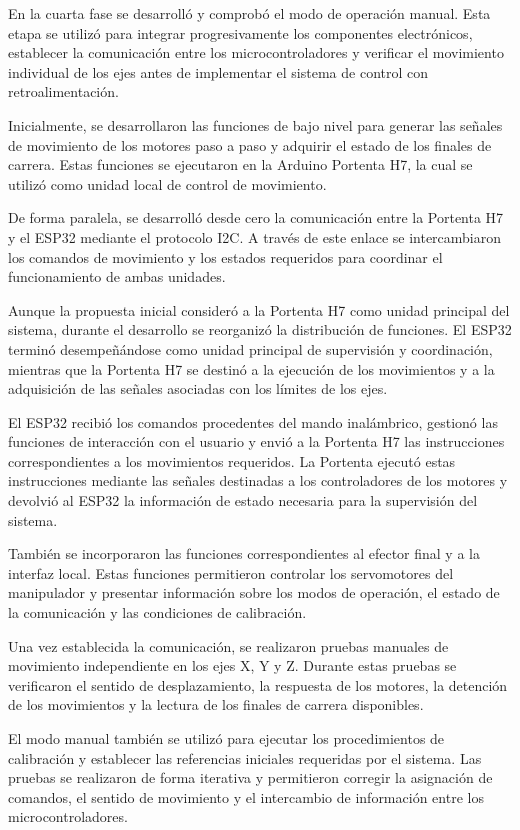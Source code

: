 En la cuarta fase se desarrolló y comprobó el modo de operación manual. Esta etapa se utilizó para integrar progresivamente los componentes electrónicos, establecer la comunicación entre los microcontroladores y verificar el movimiento individual de los ejes antes de implementar el sistema de control con retroalimentación.

Inicialmente, se desarrollaron las funciones de bajo nivel para generar las señales de movimiento de los motores paso a paso y adquirir el estado de los finales de carrera. Estas funciones se ejecutaron en la Arduino Portenta H7, la cual se utilizó como unidad local de control de movimiento.

De forma paralela, se desarrolló desde cero la comunicación entre la Portenta H7 y el ESP32 mediante el protocolo I2C. A través de este enlace se intercambiaron los comandos de movimiento y los estados requeridos para coordinar el funcionamiento de ambas unidades.

Aunque la propuesta inicial consideró a la Portenta H7 como unidad principal del sistema, durante el desarrollo se reorganizó la distribución de funciones. El ESP32 terminó desempeñándose como unidad principal de supervisión y coordinación, mientras que la Portenta H7 se destinó a la ejecución de los movimientos y a la adquisición de las señales asociadas con los límites de los ejes.

El ESP32 recibió los comandos procedentes del mando inalámbrico, gestionó las funciones de interacción con el usuario y envió a la Portenta H7 las instrucciones correspondientes a los movimientos requeridos. La Portenta ejecutó estas instrucciones mediante las señales destinadas a los controladores de los motores y devolvió al ESP32 la información de estado necesaria para la supervisión del sistema.

También se incorporaron las funciones correspondientes al efector final y a la interfaz local. Estas funciones permitieron controlar los servomotores del manipulador y presentar información sobre los modos de operación, el estado de la comunicación y las condiciones de calibración.

Una vez establecida la comunicación, se realizaron pruebas manuales de movimiento independiente en los ejes X, Y y Z. Durante estas pruebas se verificaron el sentido de desplazamiento, la respuesta de los motores, la detención de los movimientos y la lectura de los finales de carrera disponibles.

El modo manual también se utilizó para ejecutar los procedimientos de calibración y establecer las referencias iniciales requeridas por el sistema. Las pruebas se realizaron de forma iterativa y permitieron corregir la asignación de comandos, el sentido de movimiento y el intercambio de información entre los microcontroladores.

